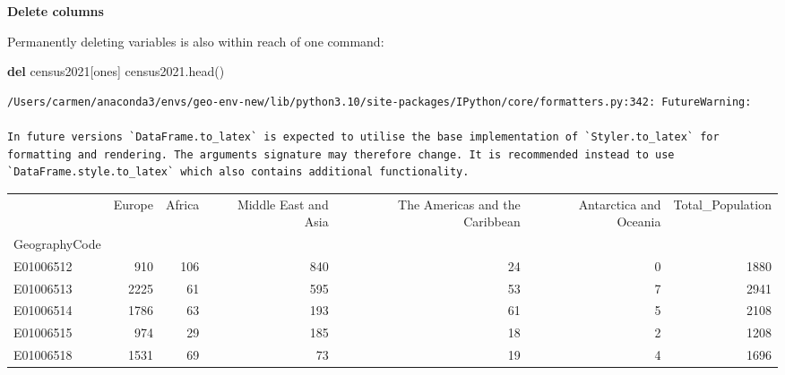 \documentclass[
  letterpaper,
  DIV=11,
  numbers=noendperiod]{scrreprt}
\newenvironment{Shaded}{\begin{snugshade}}{\end{snugshade}}
\newcommand{\KeywordTok}[1]{\textcolor[rgb]{0.00,0.23,0.31}{\textbf{#1}}}
\newcommand{\NormalTok}[1]{\textcolor[rgb]{0.00,0.23,0.31}{#1}}
\newcommand{\StringTok}[1]{\textcolor[rgb]{0.13,0.47,0.30}{#1}}
\begin{document}
\textbf{Delete columns}

Permanently deleting variables is also within reach of one command:

\begin{Shaded}
\begin{Highlighting}[]
\KeywordTok{del}\NormalTok{ census2021[}\StringTok{\textquotesingle{}ones\textquotesingle{}}\NormalTok{]}
\NormalTok{census2021.head()}
\end{Highlighting}
\end{Shaded}

\begin{verbatim}
/Users/carmen/anaconda3/envs/geo-env-new/lib/python3.10/site-packages/IPython/core/formatters.py:342: FutureWarning:

In future versions `DataFrame.to_latex` is expected to utilise the base implementation of `Styler.to_latex` for formatting and rendering. The arguments signature may therefore change. It is recommended instead to use `DataFrame.style.to_latex` which also contains additional functionality.
\end{verbatim}

\begin{tabular}{lrrrrrr}
\toprule
{} &  Europe &  Africa &  Middle East and Asia &  The Americas and the Caribbean &  Antarctica and Oceania &  Total\_Population \\
GeographyCode &         &         &                       &                                 &                         &                   \\
\midrule
E01006512     &     910 &     106 &                   840 &                              24 &                       0 &              1880 \\
E01006513     &    2225 &      61 &                   595 &                              53 &                       7 &              2941 \\
E01006514     &    1786 &      63 &                   193 &                              61 &                       5 &              2108 \\
E01006515     &     974 &      29 &                   185 &                              18 &                       2 &              1208 \\
E01006518     &    1531 &      69 &                    73 &                              19 &                       4 &              1696 \\
\bottomrule
\end{tabular}
\end{document}
